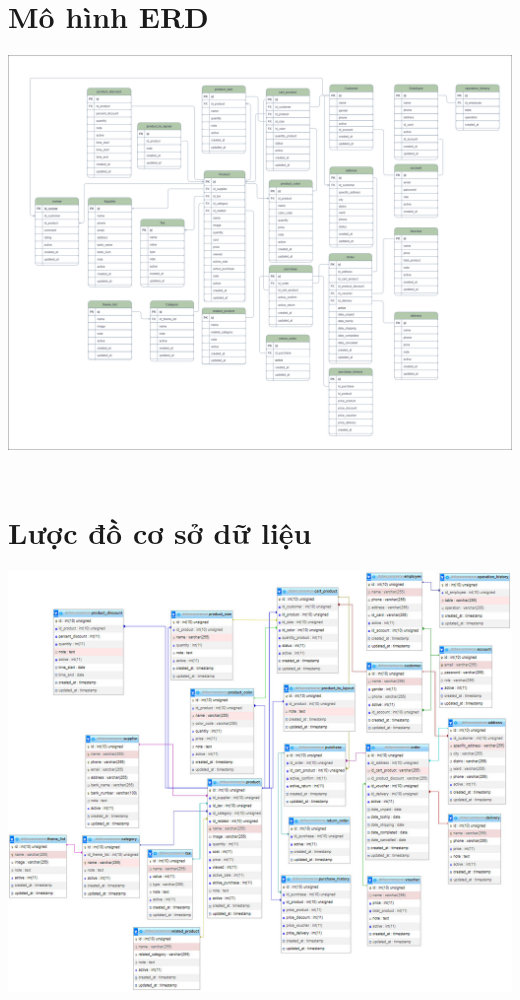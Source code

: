 \documentclass[12pt,a4paper,2sides]{report}
\begin{document}
\section{Mô hình ERD}
    \includegraphics[width=1\linewidth]{lib/ERD.png}\\\vspace*{1cm} 
    \hspace{5cm}{Hình 34. Mô hình ERD}\\
\section{Lược đồ cơ sở dữ liệu}
    \includegraphics[width=1\linewidth]{lib/luocdocsdl.jpg}\\\vspace*{1cm} 
    \hspace{5cm}{Hình 35. Lược đồ cơ sở dữ liệu}\\
\end{document}
